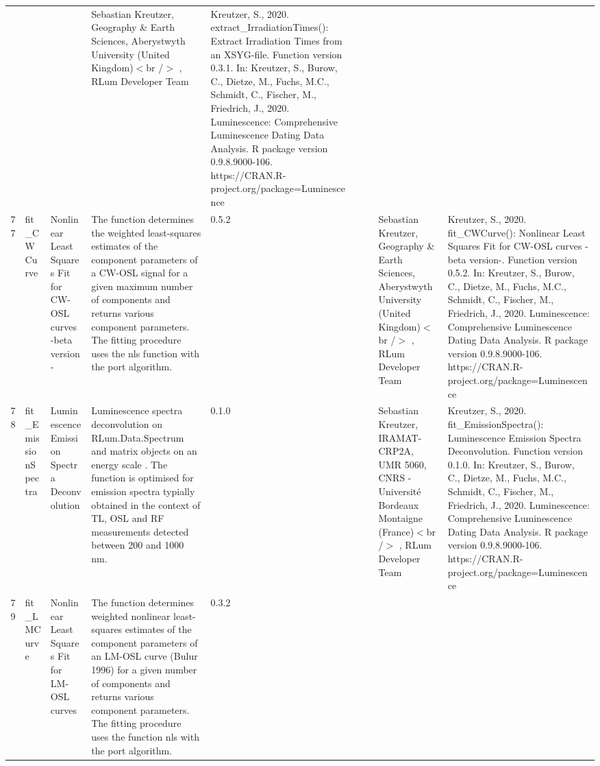 \begin{table}[ht]
\begin{tabular}{rllllllll}
 &  &  & Sebastian Kreutzer, Geography \& Earth Sciences, Aberystwyth University (United Kingdom)$<$br /$>$ , RLum Developer Team & Kreutzer, S., 2020. extract\_IrradiationTimes(): Extract Irradiation Times from an XSYG-file. Function version 0.3.1. In: Kreutzer, S., Burow, C., Dietze, M., Fuchs, M.C., Schmidt, C., Fischer, M., Friedrich, J., 2020. Luminescence: Comprehensive Luminescence Dating Data Analysis. R package version 0.9.8.9000-106. https://CRAN.R-project.org/package=Luminescence
 \\ 
  77 & fit\_CWCurve & Nonlinear Least Squares Fit for CW-OSL curves -beta version- & The function determines the weighted least-squares estimates of the component parameters of a CW-OSL signal for a given maximum number of components and returns various component parameters. The fitting procedure uses the  nls  function with the  port  algorithm. & 0.5.2
 &  &  & Sebastian Kreutzer, Geography \& Earth Sciences, Aberystwyth University (United Kingdom)$<$br /$>$ , RLum Developer Team & Kreutzer, S., 2020. fit\_CWCurve(): Nonlinear Least Squares Fit for CW-OSL curves -beta version-. Function version 0.5.2. In: Kreutzer, S., Burow, C., Dietze, M., Fuchs, M.C., Schmidt, C., Fischer, M., Friedrich, J., 2020. Luminescence: Comprehensive Luminescence Dating Data Analysis. R package version 0.9.8.9000-106. https://CRAN.R-project.org/package=Luminescence
 \\ 
  78 & fit\_EmissionSpectra & Luminescence Emission Spectra Deconvolution & Luminescence spectra deconvolution on  RLum.Data.Spectrum  and  matrix  objects on an  energy scale . The function is optimised for emission spectra typially obtained in the context of TL, OSL and RF measurements detected between 200 and 1000 nm. & 0.1.0
 &  &  & Sebastian Kreutzer, IRAMAT-CRP2A, UMR 5060, CNRS - Université Bordeaux Montaigne (France)$<$br /$>$ , RLum Developer Team & Kreutzer, S., 2020. fit\_EmissionSpectra(): Luminescence Emission Spectra Deconvolution. Function version 0.1.0. In: Kreutzer, S., Burow, C., Dietze, M., Fuchs, M.C., Schmidt, C., Fischer, M., Friedrich, J., 2020. Luminescence: Comprehensive Luminescence Dating Data Analysis. R package version 0.9.8.9000-106. https://CRAN.R-project.org/package=Luminescence
 \\ 
  79 & fit\_LMCurve & Nonlinear Least Squares Fit for LM-OSL curves & The function determines weighted nonlinear least-squares estimates of the component parameters of an LM-OSL curve (Bulur 1996) for a given number of components and returns various component parameters. The fitting procedure uses the function  nls  with the  port  algorithm. & 0.3.2

\end{tabular}
\end{table}

